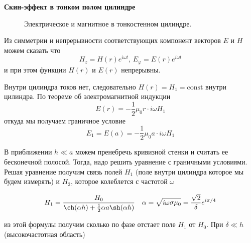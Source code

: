 \documentclass[a4paper, 12pt]{article}%
\begin{document}
	\textbf{Скин-эффект в тонком полом цилиндре}
	\begin{figure}[H]
		\caption{ Электрическое и магнитное в тонкостенном цилиндре.}
	\end{figure}
	Из симметрии и 
	непрерывности соответствующих компонент векторов ${E}$ и ${H}$ можем сказать что
	\begin{equation}
		H_z = H(r)e^{i\omega t} \text{, } E_\varphi = E(r)e^{i\omega t}
	\end{equation}
	и при этом функции $H(r)$ и $E(r)$ непрерывны.
	
	Внутри цилиндра токов нет, следовательно $H(r)=H_1=\text{const}$ внутри цилиндра.
	По теореме об электромагнитной индукции
	\begin{equation}
		E(r) = -\frac{1}{2}\mu_0 r \cdot i \omega H_1
	\end{equation}
	откуда мы получаем граничное условие
	\begin{equation}
		E_1=E(a)= -\frac{1}{2}\mu_0 a \cdot i \omega H_1
		\label{eq:granichnoe_uslovie_E}
	\end{equation}
	
	В приближении $h \ll a$ можем пренебречь кривизной стенки и считать ее бесконечной полосой. Тогда, надо решить уравнение
	с граничными условиями. Решая уравнение получим связь полей $H_1$ 
	(поле внутри цилиндра которое мы будем измерять) и $H_2$, которое колеблется с частотой
	$\omega$
	
	\begin{equation}
		H_1 = \frac{H_0}{\ch(\alpha h) + \frac{1}{2} \alpha a \sh(\alpha h)} 
		\text{\ \ \ }
		\alpha = \sqrt{i\omega \sigma \mu_0} = \frac{\sqrt{2}}{\delta}e^{i\pi/4}
		\label{eq:svyaz_poley}
	\end{equation}
	
	из этой формулы получим сколько по фазе отстает поле $H_1$ от $H_0$. При $\delta \ll h$
	(высокочастотная область)
	
\end{document}
